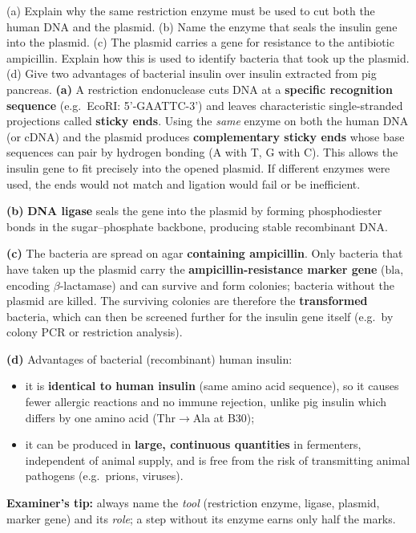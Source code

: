 \documentclass[11pt]{article}
\begin{document}
\begin{exoresolu}
(a) Explain why the same restriction enzyme must be used to cut both the human DNA and the plasmid. (b) Name the enzyme that seals the insulin gene into the plasmid. (c) The plasmid carries a gene for resistance to the antibiotic ampicillin. Explain how this is used to identify bacteria that took up the plasmid. (d) Give two advantages of bacterial insulin over insulin extracted from pig pancreas.
\tcblower
\textbf{(a)} A restriction endonuclease cuts DNA at a \textbf{specific recognition sequence} (e.g.\ EcoRI: 5'-GAATTC-3') and leaves characteristic single-stranded projections called \textbf{sticky ends}. Using the \emph{same} enzyme on both the human DNA (or cDNA) and the plasmid produces \textbf{complementary sticky ends} whose base sequences can pair by hydrogen bonding (A with T, G with C). This allows the insulin gene to fit precisely into the opened plasmid. If different enzymes were used, the ends would not match and ligation would fail or be inefficient.

\textbf{(b)} \textbf{DNA ligase} seals the gene into the plasmid by forming phosphodiester bonds in the sugar--phosphate backbone, producing stable recombinant DNA.

\textbf{(c)} The bacteria are spread on agar \textbf{containing ampicillin}. Only bacteria that have taken up the plasmid carry the \textbf{ampicillin-resistance marker gene} ($\mathrm{bla}$, encoding $\beta$-lactamase) and can survive and form colonies; bacteria without the plasmid are killed. The surviving colonies are therefore the \textbf{transformed} bacteria, which can then be screened further for the insulin gene itself (e.g.\ by colony PCR or restriction analysis).

\textbf{(d)} Advantages of bacterial (recombinant) human insulin:
\begin{itemize}
\item it is \textbf{identical to human insulin} (same amino acid sequence), so it causes fewer allergic reactions and no immune rejection, unlike pig insulin which differs by one amino acid (Thr$\rightarrow$Ala at B30);
\item it can be produced in \textbf{large, continuous quantities} in fermenters, independent of animal supply, and is free from the risk of transmitting animal pathogens (e.g.\ prions, viruses).
\end{itemize}
\textbf{Examiner's tip:} always name the \emph{tool} (restriction enzyme, ligase, plasmid, marker gene) and its \emph{role}; a step without its enzyme earns only half the marks.
\end{exoresolu}
\end{document}
